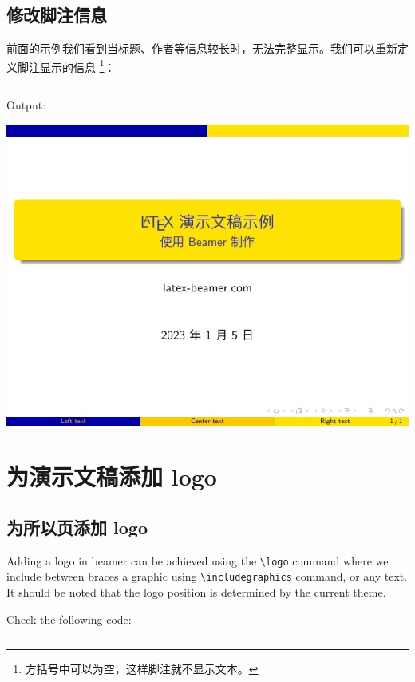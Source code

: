 \subsection{修改脚注信息}

前面的示例我们看到当标题、作者等信息较长时，无法完整显示。我们可以重新定义脚注显示的信息
\footnote{方括号中可以为空，这样脚注就不显示文本。}：

\inputminted[linenos=true]{latex}{examples/beamer/title-page-footer.tex}

Output:

\includegraphics{examples/beamer/title-page-footer.pdf}

\section{为演示文稿添加 logo}

\subsection{为所以页添加 logo}

Adding a logo in beamer can be achieved using the \verb|\logo| command where we include between braces a graphic using \verb|\includegraphics| command, or any text. It should be noted that the logo position is determined by the current theme.

Check the following code:

\inputminted[linenos=true]{latex}{examples/beamer/logo-for-all-pages.tex}


